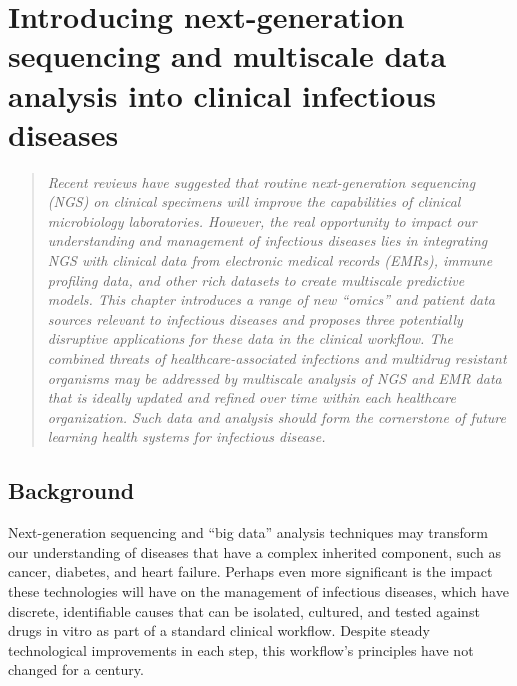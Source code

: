 
\chapter{Introducing next-generation sequencing and multiscale data analysis into clinical infectious diseases}

\begin{quote}
\emph{Recent reviews have suggested that routine next-generation sequencing (NGS) on clinical specimens will improve the capabilities of clinical microbiology laboratories. However, the real opportunity to impact our understanding and management of infectious diseases lies in integrating NGS with clinical data from electronic medical records (EMRs), immune profiling data, and other rich datasets to create multiscale predictive models. This chapter introduces a range of new “omics” and patient data sources relevant to infectious diseases and proposes three potentially disruptive applications for these data in the clinical workflow. The combined threats of healthcare-associated infections and multidrug resistant organisms may be addressed by multiscale analysis of NGS and EMR data that is ideally updated and refined over time within each healthcare organization. Such data and analysis should form the cornerstone of future learning health systems for infectious disease.}
\end{quote}

\section{Background}

Next-generation sequencing and “big data” analysis techniques may transform our understanding of diseases that have a complex inherited component, such as cancer, diabetes, and heart failure. Perhaps even more significant is the impact these technologies will have on the management of infectious diseases, which have discrete, identifiable causes that can be isolated, cultured, and tested against drugs in vitro as part of a standard clinical workflow. Despite steady technological improvements in each step, this workflow’s principles have not changed for a century.\autocite{Didelot2012,Koser2012}

